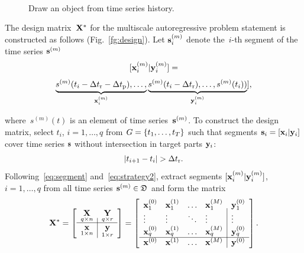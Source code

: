 \documentclass[conference]{IEEEtran}
\begin{document}
\begin{figure}[!ht]
\centering
{} \\
\centering{}
\caption{Draw an object from time series history.}
\end{figure}

The design matrix~${\mathbf{X}}^*$ for the multiscale autoregressive problem statement is constructed  as follows (Fig.~\ref{fg:design}). Let ${\mathbf{s}}^{(m)}_i$ denote the~$i$-th segment of the time series ${\mathbf{s}}^{(m)}$
\begin{equation}\label{eq:segment}
[\bx^{(m)}_i | \by^{(m)}_i] = \end{equation}
\[ \underbrace{s^{(m)}(t_i-\Delta t_\text{r}-\Delta t_\text{p}),\dots,}_{{\mathbf{x}}^{(m)}_i} \underbrace{s^{(m)}(t_i-\Delta t_\text{r}),\dots,s^{(m)}(t_i))}_{{\mathbf{y}}^{(m)}_i}], \]

where~$s^{(m)}(t)$ is an element of time series~${\mathbf{s}}^{(m)}$. To construct the design matrix, select $t_i$, $i = 1, \dots, q$ from $G = \{t_1, \dots, t_T\}$ such that segments ${\mathbf{s}}_i = [{\mathbf{x}}_i|{\mathbf{y}}_i]$ cover time series ${\mathbf{s}}$
without intersection in target parts  ${\mathbf{y}}_i$:
\begin{equation}\label{eq:strategy2} |t_{i+1} - t_i| > \dtr.
\end{equation}
Following~\eqref{eq:segment} and~\eqref{eq:strategy2}, extract segments $[{\mathbf{x}}^{(m)}_i | {\mathbf{y}}^{(m)}_i]$, $i = 1, \dots, q$ from all time series ${\mathbf{s}}^{(m)} \in {\mathfrak{D}}$ and form the matrix
 \[
{\mathbf{X}}^*= \left[
\begin{array}{c|c}
 \underset{q{\times}n}{{\mathbf{X}}} & \underset{q{\times}r}{\mathbf{Y}}  \\
 \hline
 \underset{1{\times}n}{{\mathbf{x}}} & \underset{1{\times}r}{{{\mathbf{y}}}}  \\
\end{array}
\right] = \left[
\begin{array}{llll|l}
{\mathbf{x}}_1^{(0)} & {\mathbf{x}}_1^{(1)}  & \dots & {\mathbf{x}}_1^{(M)} & {\mathbf{y}}_1^{(0)}   \\
\vdots & \vdots & \ddots & \vdots & \vdots   \\
{\mathbf{x}}_q^{(0)} &  {\mathbf{x}}_q^{(1)} & \dots & {\mathbf{x}}_q^{(M)} & {\mathbf{y}}_q^{(0)}   \\

\hline
{\mathbf{x}}^{(0)} &  {\mathbf{x}}^{(1)} & \dots & {\mathbf{x}}^{(M)} &  {{\mathbf{y}}}^{(0)}   \\
\end{array}
\right]. \]
\end{document}
